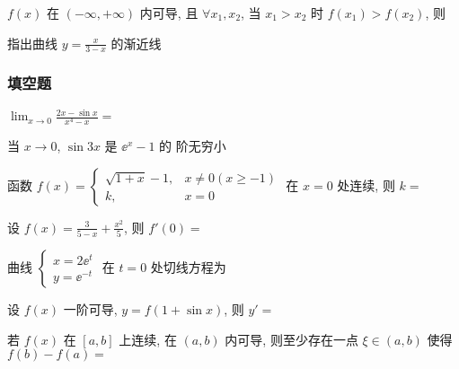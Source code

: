 \begin{ti}
	$f(x)$ 在 $(-\infty,+\infty)$ 内可导, 且 $\forall x_{1},x_{2}$, 当 $x_{1} > x_{2}$ 时 $f(x_{1}) > f(x_{2})$, 则\kuo
\end{ti}

\begin{ti}
	指出曲线 $y = \frac{x}{3 - x}$ 的渐近线\kuo
\end{ti}

\subsubsection{填空题}
\begin{ti}
	$\lim_{x \to 0} \frac{2x - \sin x}{x^{4} - x} = $ \hua
\end{ti}

\begin{ti}
	当 $x \to 0$, $\sin 3x$ 是 $\ee^{x} - 1$ 的 \hua 阶无穷小
\end{ti}

\begin{ti}
	函数 $f(x) = \begin{cases}
		\sqrt{1 + x} - 1, & x \ne 0 (x \geqslant -1) \\
		k, & x = 0
	\end{cases}$ 在 $x = 0$ 处连续, 则 $k = $ \hua 
\end{ti}

\begin{ti}
	设 $f(x) = \frac{3}{5 - x} + \frac{x^{2}}{5}$, 则 $f'(0) = $ \hua
\end{ti}

\begin{ti}
	曲线 $\begin{cases}
		x = 2 \ee^{t} \\
		y = \ee^{-t}
	\end{cases}$ 在 $t = 0$ 处切线方程为\hua
\end{ti}

\begin{ti}
	设 $f(x)$ 一阶可导, $y = f(1 + \sin x)$, 则 $y' = $ \hua
\end{ti}

\begin{ti}
	若 $f(x)$ 在 $[a,b]$ 上连续, 在 $(a,b)$ 内可导, 则至少存在一点 $\xi \in (a,b)$ 使得 $f(b) - f(a) = $ \hua
\end{ti}

